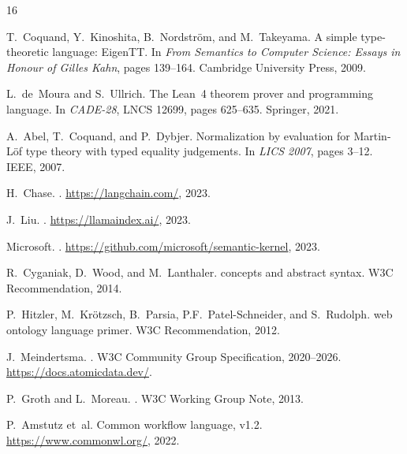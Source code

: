 \documentclass[10pt,twocolumn,letterpaper]{article}
\begin{document}

\begin{thebibliography}{16}

T.~Coquand, Y.~Kinoshita, B.~Nordstr{\"o}m, and M.~Takeyama.
\newblock A simple type-theoretic language: {EigenTT}.
\newblock In \emph{From Semantics to Computer Science: Essays in Honour of Gilles Kahn}, pages 139--164. Cambridge University Press, 2009.

L.~de~Moura and S.~Ullrich.
\newblock The {Lean~4} theorem prover and programming language.
\newblock In \emph{CADE-28}, LNCS 12699, pages 625--635. Springer, 2021.

A.~Abel, T.~Coquand, and P.~Dybjer.
\newblock Normalization by evaluation for {Martin-L{\"o}f} type theory with typed equality judgements.
\newblock In \emph{LICS 2007}, pages 3--12. IEEE, 2007.

H.~Chase.
.
\newblock \url{https://langchain.com/}, 2023.

J.~Liu.
.
\newblock \url{https://llamaindex.ai/}, 2023.

Microsoft.
.
\newblock \url{https://github.com/microsoft/semantic-kernel}, 2023.

R.~Cyganiak, D.~Wood, and M.~Lanthaler.
 concepts and abstract syntax.
\newblock W3C Recommendation, 2014.

P.~Hitzler, M.~Kr{\"o}tzsch, B.~Parsia, P.F.~Patel-Schneider, and S.~Rudolph.
 web ontology language primer.
\newblock W3C Recommendation, 2012.

J.~Meindertsma.
.
\newblock W3C Community Group Specification, 2020--2026.
\newblock \url{https://docs.atomicdata.dev/}.

P.~Groth and L.~Moreau.
.
\newblock W3C Working Group Note, 2013.

P.~Amstutz et~al.
\newblock Common workflow language, v1.2.
\newblock \url{https://www.commonwl.org/}, 2022.


\end{thebibliography}
\end{document}

